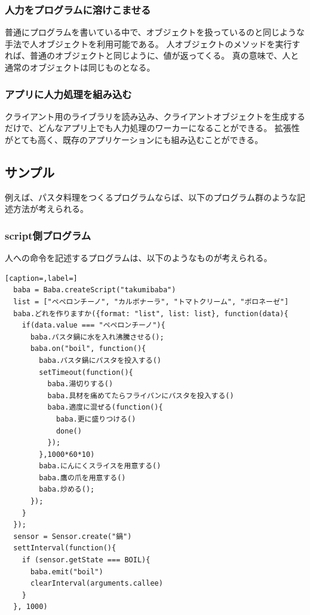 \documentclass{deimj}
\begin{document}
\subsubsection{人力をプログラムに溶けこませる}
普通にプログラムを書いている中で、オブジェクトを扱っているのと同じような手法で人オブジェクトを利用可能である。
人オブジェクトのメソッドを実行すれば、普通のオブジェクトと同じように、値が返ってくる。
真の意味で、人と通常のオブジェクトは同じものとなる。

\subsubsection{アプリに人力処理を組み込む}
クライアント用のライブラリを読み込み、クライアントオブジェクトを生成するだけで、どんなアプリ上でも人力処理のワーカーになることができる。
拡張性がとても高く、既存のアプリケーションにも組み込むことができる。

\subsection{サンプル}
例えば、パスタ料理をつくるプログラムならば、以下のプログラム群のような記述方法が考えられる。

\subsubsection{script側プログラム}
人への命令を記述するプログラムは、以下のようなものが考えられる。

\begin{lstlisting}[caption=,label=]
  baba = Baba.createScript("takumibaba")
  list = ["ペペロンチーノ", "カルボナーラ", "トマトクリーム", "ボロネーゼ"]
  baba.どれを作りますか({format: "list", list: list}, function(data){
    if(data.value === "ペペロンチーノ"){
      baba.パスタ鍋に水を入れ沸騰させる();
      baba.on("boil", function(){
        baba.パスタ鍋にパスタを投入する()
        setTimeout(function(){
          baba.湯切りする()
          baba.具材を痛めてたらフライパンにパスタを投入する()
          baba.適度に混ぜる(function(){
            baba.更に盛りつける()
            done()
          });
        },1000*60*10)
        baba.にんにくスライスを用意する()
        baba.鷹の爪を用意する()
        baba.炒める();
      });
    }
  });
  sensor = Sensor.create("鍋")
  settInterval(function(){
    if (sensor.getState === BOIL){
      baba.emit("boil")
      clearInterval(arguments.callee)
    }
  }, 1000)
\end{lstlisting}
  
\end{document}
